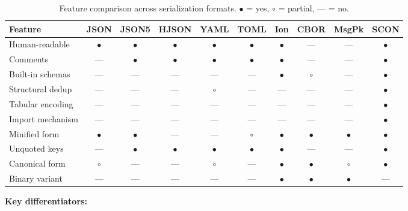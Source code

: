 \documentclass[11pt, a4paper]{article}
\begin{document}
\begin{table}[ht]
\centering
\caption{Feature comparison across serialization formats.
         $\bullet$ = yes, $\circ$ = partial, --- = no.}
\label{tab:related}
\small
\begin{tabular}{l cccccccc c}
\toprule
Feature & JSON & JSON5 & HJSON & YAML & TOML & Ion & CBOR & MsgPk & \textbf{SCON} \\
\midrule
Human-readable       & $\bullet$ & $\bullet$ & $\bullet$ & $\bullet$ & $\bullet$ & $\bullet$ & --- & --- & $\bullet$ \\
Comments             & --- & $\bullet$ & $\bullet$ & $\bullet$ & $\bullet$ & $\bullet$ & --- & --- & $\bullet$ \\
Built-in schemas     & --- & --- & --- & --- & --- & $\bullet$ & $\circ$ & --- & $\bullet$ \\
Structural dedup     & --- & --- & --- & $\circ$ & --- & --- & --- & --- & $\bullet$ \\
Tabular encoding     & --- & --- & --- & --- & --- & --- & --- & --- & $\bullet$ \\
Import mechanism     & --- & --- & --- & --- & --- & --- & --- & --- & $\bullet$ \\
Minified form        & $\bullet$ & $\bullet$ & --- & --- & $\circ$ & $\bullet$ & $\bullet$ & $\bullet$ & $\bullet$ \\
Unquoted keys        & --- & $\bullet$ & $\bullet$ & $\bullet$ & $\bullet$ & $\bullet$ & --- & --- & $\bullet$ \\
Canonical form       & $\circ$ & --- & --- & $\circ$ & --- & $\bullet$ & $\bullet$ & $\circ$ & $\bullet$ \\
Binary variant       & --- & --- & --- & --- & --- & $\bullet$ & $\bullet$ & $\bullet$ & --- \\
\bottomrule
\end{tabular}
\end{table}

\noindent \textbf{Key differentiators:}
\end{document}
